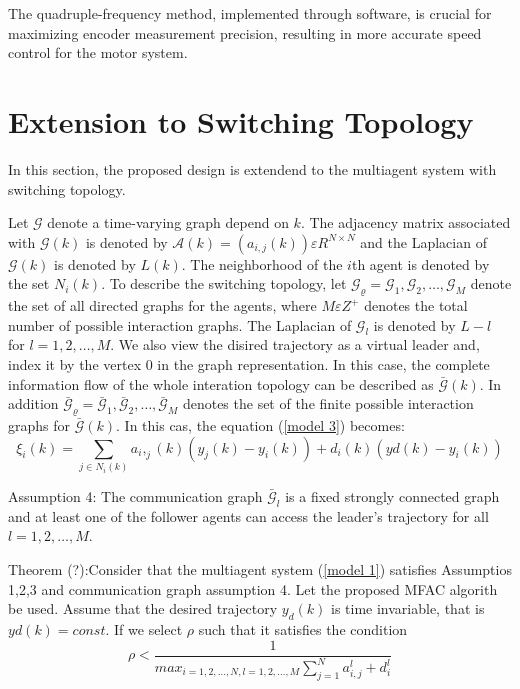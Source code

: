 \documentclass[journal,onecolumn]{IEEEtran}
\begin{document}
The quadruple-frequency method, implemented through software, is crucial for maximizing encoder measurement precision, resulting in more accurate speed control for the motor system.


\section{Extension to Switching Topology}

In this section, the proposed design is extendend to the multiagent system with switching topology.

Let \(\mathcal{G}\) denote a time-varying graph depend on \(k\). The adjacency matrix associated with \(\mathcal{G}(k)\) is denoted by \(\mathcal{A}(k) = (a_{i,j}(k)) \varepsilon R^{N \times N} \) and the Laplacian of \(\mathcal{G}(k)\) is denoted by \(L(k)\). The neighborhood of the \(i\)th agent is denoted by the set \(N_i(k)\). To describe the switching topology, let \(\mathcal{G}_\varrho  =\mathcal{G}_1, \mathcal{G}_2, \dots ,\mathcal{G}_M \) denote the set of all directed graphs for the agents, where \(M \varepsilon Z^+\) denotes the total number of possible interaction graphs. The Laplacian of \(\mathcal{G}_l\) is denoted by \(L-l\) for \(l = 1,2, \dots, M\). We also view the disired trajectory as a virtual leader and, index it by the vertex 0 in the graph representation. In this case, the complete information flow of the whole interation topology can be described as \( \bar{\mathcal{G}}(k)\). 
In addition \(\bar{\mathcal{G}}_\varrho  =\bar{\mathcal{G}}_1 , \bar{\mathcal{G}}_2 , \dots ,\bar{\mathcal{G}}_M  \) denotes the set of the finite possible interaction graphs for \(\bar{\mathcal{G}}(k)\).
In this cas, the equation (\ref{model 3}) becomes:
\begin{equation}
    \label{model 41}
    \xi_i(k) = \sum_{j \in N_i(k)} a_i,_j(k)( y_j(k)-y_i(k)) + d_i(k)(yd(k) - y_i(k ))
\end{equation}

Assumption 4: The communication graph \(\bar{\mathcal{G}}_l\) is a fixed strongly connected graph and at least one of the follower agents can access the leader's trajectory for all \(l = 1,2,\dots,M\).

Theorem (?):Consider that the multiagent system (\ref{model 1}) satisfies Assumptios 1,2,3  and communication graph assumption 4. Let the proposed MFAC algorith be used. Assume that the desired trajectory \(y_d(k)\) is time invariable, that is \(yd(k) = const \). If we select \(\rho\) such that it satisfies the condition
\[
    \rho < \frac{1}{max_{i=1,2,\dots,N,l=1,2,\dots,M}\sum_{j=1}^{N}a_{i,j}^l + d_i^l}
\]
\end{document}
